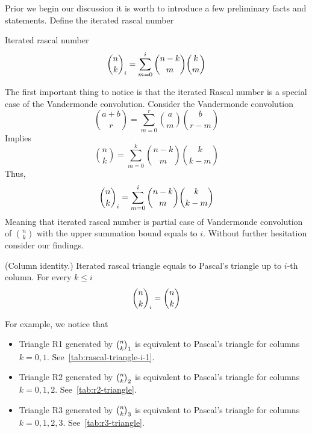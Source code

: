 Prior we begin our discussion it is worth to introduce a few preliminary facts and statements.
Define the iterated rascal number~\cite[eq. 3.2]{gregory2022iterated_thesis}
\begin{definition}
    Iterated rascal number
    \begin{align}
        \binom{n}{k}_{i} = \sum_{m=0}^{i} \binom{n-k}{m} \binom{k}{m}
    \end{align}
\end{definition}
The first important thing to notice is that the iterated Rascal number is a special case of the Vandermonde convolution.
Consider the Vandermonde convolution~\cite{andrews1999special}
\begin{equation*}
    \binom{a+b}{r} = \sum_{m=0}^{r} \binom{a}{m} \binom{b}{r-m}
\end{equation*}
Implies
\begin{equation*}
    \binom{n}{k} = \sum_{m=0}^{k} \binom{n-k}{m} \binom{k}{k-m}
\end{equation*}
Thus,
\begin{equation}
    \binom{n}{k}_{i} = \sum_{m=0}^{i} \binom{n-k}{m} \binom{k}{k-m}
    \label{eq:rascal-vandermonde-convolution}
\end{equation}
Meaning that iterated rascal number is partial case of Vandermonde convolution of $\binom{n}{k}$
with the upper summation bound equals to $i$.
Without further hesitation consider our findings.
\begin{proposition}
    \label{prop:rascal-binomial-identity-for-i}
    (Column identity.)
    Iterated rascal triangle equals to Pascal's triangle up to $i$-th column.
    For every $k\leq i$
    \begin{equation}
        \binom{n}{k}_{i} = \binom{n}{k}
        \label{eq:rascal-column-identity}
    \end{equation}
\end{proposition}
For example, we notice that
\begin{itemize}
    \item Triangle R1 generated by $\binom{n}{k}_{1}$ is equivalent to Pascal's triangle for columns $k=0,1$.
    See~\eqref{tab:rascal-triangle-i-1}.
    \item Triangle R2 generated by $\binom{n}{k}_{2}$ is equivalent to Pascal's triangle for columns $k=0,1,2$.
    See~\eqref{tab:r2-triangle}.
    \item Triangle R3 generated by $\binom{n}{k}_{3}$ is equivalent to Pascal's triangle for columns $k=0,1,2,3$.
    See~\eqref{tab:r3-triangle}.
\end{itemize}
